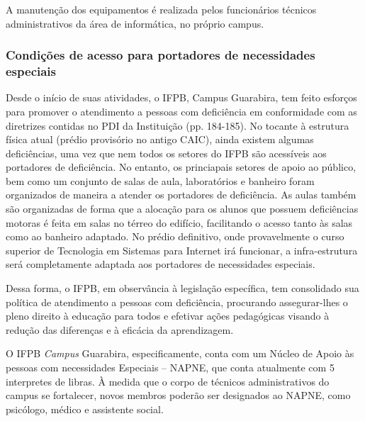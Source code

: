 A manutenção dos equipamentos é realizada pelos funcionários técnicos administrativos da área de informática, no próprio campus.

\subsubsection{Condições de acesso para portadores de necessidades especiais}

	Desde o início de suas atividades, o IFPB, Campus Guarabira, tem feito esforços para promover o atendimento a pessoas com deficiência em conformidade com as diretrizes contidas no PDI da Instituição (pp. 184-185). No tocante à estrutura física atual (pr\'edio provis\'orio no antigo CAIC), ainda existem algumas defici\^encias, uma vez que nem todos os setores do IFPB são acessíveis aos portadores de defici\^encia. No entanto, os princiapais setores de apoio ao p\'ublico, bem como um conjunto de salas de aula, laborat\'orios e banheiro foram organizados de maneira a atender os portadores de defici\^encia. As aulas também são organizadas de forma que a alocação para os alunos que possuem deficiências motoras é feita em salas no térreo do edifício, facilitando o acesso tanto às salas como ao banheiro adaptado. No pr\'edio definitivo, onde provavelmente o curso superior de Tecnologia em Sistemas para Internet ir\'a funcionar, a infra-estrutura ser\'a completamente adaptada aos portadores de necessidades especiais.

	Dessa forma, o IFPB, em observância à legislação específica, tem consolidado sua política de atendimento a pessoas com deficiência, procurando assegurar-lhes o pleno direito à educação para todos e efetivar ações pedagógicas visando à redução das diferenças e à eficácia da aprendizagem.
 
	O IFPB \textit{Campus} Guarabira, especificamente, conta com um Núcleo de Apoio às pessoas com necessidades Especiais – NAPNE, que conta atualmente com 5 interpretes de libras. \`A medida que o corpo de t\'ecnicos administrativos do campus se fortalecer, novos membros poder\~ao ser designados ao NAPNE, como psic\'ologo, m\'edico e assistente social.



